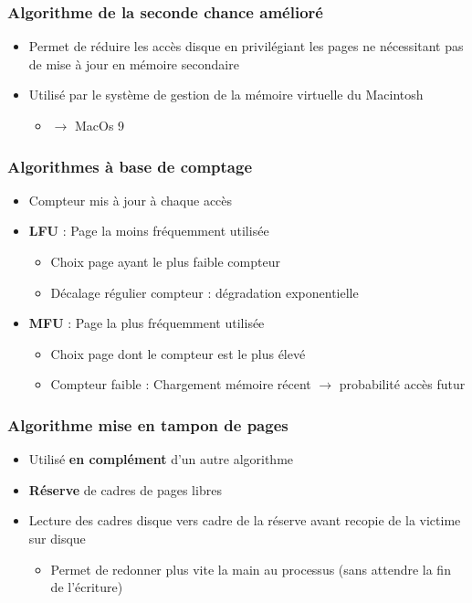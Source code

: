 \begin{frame}
\frametitle{Algorithme de la seconde chance amélioré}
\begin{itemize}
\item Permet de réduire les accès disque en privilégiant les pages ne nécessitant pas de mise à jour en mémoire secondaire
\item Utilisé par le système de gestion de la mémoire virtuelle du Macintosh
\begin{itemize}
\item $\rightarrow$ MacOs 9
\end{itemize}
\end{itemize}
\end{frame}


\begin{frame}
\frametitle{Algorithmes à base de comptage}
\begin{itemize}
\item Compteur mis à jour à chaque accès
\item \textbf{LFU} : Page la moins fréquemment utilisée
\begin{itemize}
\item Choix page ayant le plus faible compteur
\item Décalage régulier compteur : dégradation exponentielle
\end{itemize}
\item \textbf{MFU} : Page la plus fréquemment utilisée
\begin{itemize}
\item Choix page dont le compteur est le plus élevé
\item Compteur faible : Chargement mémoire récent $\rightarrow$ probabilité accès futur
\end{itemize}
\end{itemize}
\end{frame}


\begin{frame}
\frametitle{Algorithme mise en tampon de pages}
\begin{itemize}
\item Utilisé \textbf{en complément} d'un autre algorithme
\item \textbf{Réserve} de cadres de pages libres
\item Lecture des cadres disque vers cadre de la réserve avant recopie de la victime sur disque
\begin{itemize}
\item Permet de redonner plus vite la main au processus (sans attendre la fin de l'écriture)
\end{itemize}
\end{itemize}
\end{frame}


